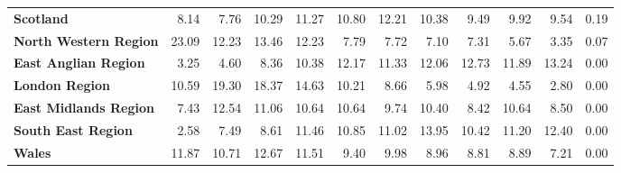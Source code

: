 \begin{table}[H]
{\begin{tabular}{lrrrrrrrrrrr}
    \textbf{Scotland} & \cellcolor{orange!46}8.14 & \cellcolor{orange!44}7.76 & \cellcolor{orange!59}10.29 & \cellcolor{orange!65}11.27 & \cellcolor{orange!62}10.80 & \cellcolor{orange!70}12.21 & \cellcolor{orange!59}10.38 & \cellcolor{orange!54}9.49 & \cellcolor{orange!57}9.92 & \cellcolor{orange!54}9.54 & \cellcolor{orange!0}0.19 \\
    \textbf{North Western Region} & \cellcolor{orange!70}23.09 & \cellcolor{orange!37}12.23 & \cellcolor{orange!41}13.46 & \cellcolor{orange!37}12.23 & \cellcolor{orange!23}7.79 & \cellcolor{orange!23}7.72 & \cellcolor{orange!21}7.10 & \cellcolor{orange!22}7.31 & \cellcolor{orange!17}5.67 & \cellcolor{orange!10}3.35 & \cellcolor{orange!0}0.07 \\
    \textbf{East Anglian Region} & \cellcolor{orange!17}3.25 & \cellcolor{orange!24}4.60 & \cellcolor{orange!44}8.36 & \cellcolor{orange!55}10.38 & \cellcolor{orange!64}12.17 & \cellcolor{orange!60}11.33 & \cellcolor{orange!64}12.06 & \cellcolor{orange!67}12.73 & \cellcolor{orange!63}11.89 & \cellcolor{orange!70}13.24 & \cellcolor{orange!0}0.00 \\
    \textbf{London Region} & \cellcolor{orange!38}10.59 & \cellcolor{orange!70}19.30 & \cellcolor{orange!67}18.37 & \cellcolor{orange!53}14.63 & \cellcolor{orange!37}10.21 & \cellcolor{orange!31}8.66 & \cellcolor{orange!22}5.98 & \cellcolor{orange!18}4.92 & \cellcolor{orange!17}4.55 & \cellcolor{orange!10}2.80 & \cellcolor{orange!0}0.00 \\
    \textbf{East Midlands Region} & \cellcolor{orange!41}7.43 & \cellcolor{orange!70}12.54 & \cellcolor{orange!62}11.06 & \cellcolor{orange!59}10.64 & \cellcolor{orange!59}10.64 & \cellcolor{orange!54}9.74 & \cellcolor{orange!58}10.40 & \cellcolor{orange!47}8.42 & \cellcolor{orange!59}10.64 & \cellcolor{orange!47}8.50 & \cellcolor{orange!0}0.00 \\
    \textbf{South East Region} & \cellcolor{orange!13}2.58 & \cellcolor{orange!38}7.49 & \cellcolor{orange!43}8.61 & \cellcolor{orange!58}11.46 & \cellcolor{orange!54}10.85 & \cellcolor{orange!55}11.02 & \cellcolor{orange!70}13.95 & \cellcolor{orange!52}10.42 & \cellcolor{orange!56}11.20 & \cellcolor{orange!62}12.40 & \cellcolor{orange!0}0.00 \\
    \textbf{Wales} & \cellcolor{orange!66}11.87 & \cellcolor{orange!59}10.71 & \cellcolor{orange!70}12.67 & \cellcolor{orange!64}11.51 & \cellcolor{orange!52}9.40 & \cellcolor{orange!55}9.98 & \cellcolor{orange!50}8.96 & \cellcolor{orange!49}8.81 & \cellcolor{orange!49}8.89 & \cellcolor{orange!40}7.21 & \cellcolor{orange!0}0.00 \\
    \bottomrule
  \end{tabular}}
\end{table}
